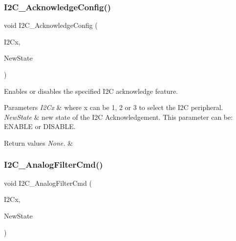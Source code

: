 \subsubsection{\texorpdfstring{I2\+C\+\_\+\+Acknowledge\+Config()}{I2C\_AcknowledgeConfig()}}
{\footnotesize\ttfamily void I2\+C\+\_\+\+Acknowledge\+Config (\begin{DoxyParamCaption}\item[{I2\+C\+\_\+\+Type\+Def $\ast$}]{I2\+Cx,  }\item[{Functional\+State}]{New\+State }\end{DoxyParamCaption})}



Enables or disables the specified I2C acknowledge feature. 


\begin{DoxyParams}{Parameters}
{\em I2\+Cx} & where x can be 1, 2 or 3 to select the I2C peripheral. \\
\hline
{\em New\+State} & new state of the I2C Acknowledgement. This parameter can be\+: E\+N\+A\+B\+LE or D\+I\+S\+A\+B\+LE. \\
\hline
\end{DoxyParams}

\begin{DoxyRetVals}{Return values}
{\em None.} & \\
\hline
\end{DoxyRetVals}
\mbox{\label{group___i2_c___group1_ga7f92bbdb33774b819232d039c73bf1c2}} 
\subsubsection{\texorpdfstring{I2\+C\+\_\+\+Analog\+Filter\+Cmd()}{I2C\_AnalogFilterCmd()}}
{\footnotesize\ttfamily void I2\+C\+\_\+\+Analog\+Filter\+Cmd (\begin{DoxyParamCaption}\item[{I2\+C\+\_\+\+Type\+Def $\ast$}]{I2\+Cx,  }\item[{Functional\+State}]{New\+State }\end{DoxyParamCaption})}



